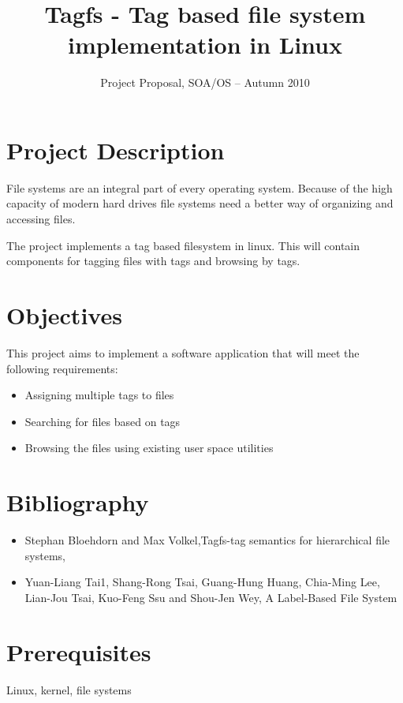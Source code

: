\documentclass{propsoa.cs.pub.ro}
\title{Tagfs - Tag based file system implementation in Linux}
\subtitle{Project Proposal, SOA/OS -- Autumn 2010}
\begin{document}
\maketitle

\section{Project Description}

File systems are an integral part of every operating system. Because of the 
high capacity of modern hard drives file systems need a better way of organizing
and accessing files.

The project implements a tag based filesystem in linux. This will contain
components for tagging files with tags and browsing by tags.

\section{Objectives}

This project aims to implement a software application that will meet the
following requirements:
\begin{itemize}
	\item Assigning multiple tags to files
	\item Searching for files based on tags
	\item Browsing the files using existing user space utilities
\end{itemize}

\section{Bibliography}

\begin{itemize}
	\item Stephan Bloehdorn and Max Volkel,Tagfs-tag semantics for hierarchical file systems, 
	\item Yuan-Liang Tai1, Shang-Rong Tsai, Guang-Hung Huang, Chia-Ming Lee,
Lian-Jou Tsai, Kuo-Feng Ssu and Shou-Jen Wey, A Label-Based File System
\end{itemize}

\section{Prerequisites}

Linux, kernel, file systems


\end{document}
